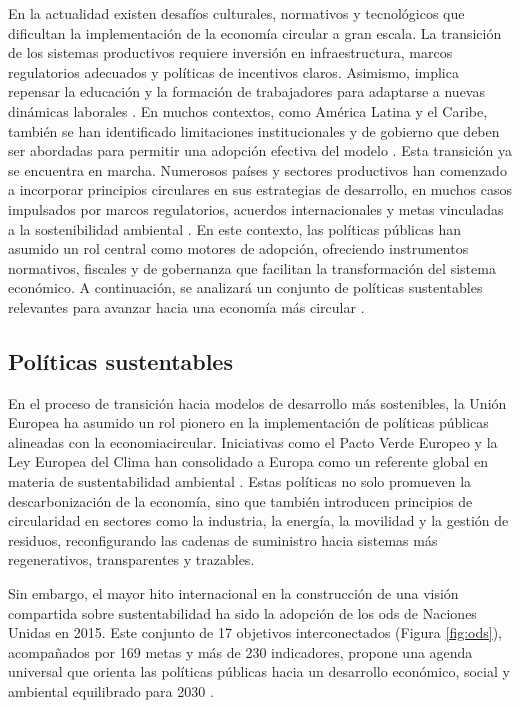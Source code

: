 En la actualidad existen desafíos culturales, normativos y tecnológicos que dificultan la implementación de la economía circular a gran escala. La transición de los sistemas productivos requiere inversión en infraestructura, marcos regulatorios adecuados y políticas de incentivos claros. Asimismo, implica repensar la educación y la formación de trabajadores para adaptarse a nuevas dinámicas laborales \cite{da2022economia}. En muchos contextos, como América Latina y el Caribe, también se han identificado limitaciones institucionales y de gobierno que deben ser abordadas para permitir una adopción efectiva del modelo \cite{cepal2021economia}. Esta transición ya se encuentra en marcha. Numerosos países y sectores productivos han comenzado a incorporar principios circulares en sus estrategias de desarrollo, en muchos casos impulsados por marcos regulatorios, acuerdos internacionales y metas vinculadas a la sostenibilidad ambiental \cite{da2022economia, cepal2021economia}. En este contexto, las políticas públicas han asumido un rol central como motores de adopción, ofreciendo instrumentos normativos, fiscales y de gobernanza que facilitan la transformación del sistema económico. A continuación, se analizará un conjunto de políticas sustentables relevantes para avanzar hacia una economía más circular .

\subsection{Políticas sustentables}

En el proceso de transición hacia modelos de desarrollo más sostenibles, la Unión Europea ha asumido un rol pionero en la implementación de políticas públicas alineadas con la \gls{economiacircular}. Iniciativas como el Pacto Verde Europeo y la Ley Europea del Clima han consolidado a Europa como un referente global en materia de sustentabilidad ambiental \cite{dormido2022cambio}. Estas políticas no solo promueven la descarbonización de la economía, sino que también introducen principios de circularidad en sectores como la industria, la energía, la movilidad y la gestión de residuos, reconfigurando las cadenas de suministro hacia sistemas más regenerativos, transparentes y trazables.

Sin embargo, el mayor hito internacional en la construcción de una visión compartida sobre sustentabilidad ha sido la adopción de los \acrfull{ods} de Naciones Unidas en 2015. Este conjunto de 17 objetivos interconectados (Figura \ref{fig:ods}), acompañados por 169 metas y más de 230 indicadores, propone una agenda universal que orienta las políticas públicas hacia un desarrollo económico, social y ambiental equilibrado para 2030 \cite{gil2018objetivos}.

